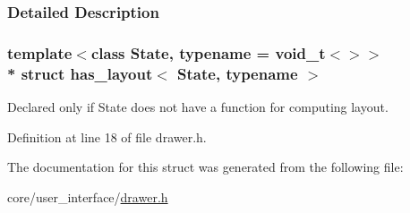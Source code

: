 \subsubsection{Detailed Description}
\subsubsection*{template$<$class State, typename = void\+\_\+t$<$$>$$>$\\*
struct has\+\_\+layout$<$ State, typename $>$}

Declared only if {\ttfamily State} does not have a function for computing layout. 

Definition at line 18 of file drawer.\+h.



The documentation for this struct was generated from the following file\+:\begin{DoxyCompactItemize}
\item 
core/user\+\_\+interface/\hyperlink{drawer_8h}{drawer.\+h}\end{DoxyCompactItemize}
